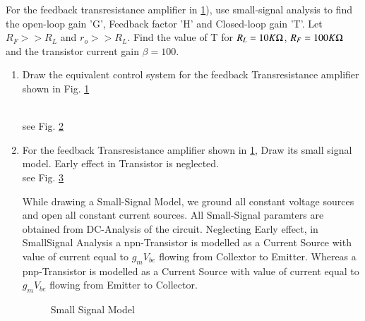 For the feedback transresistance amplifier in \ref{fig:ee18btech11046_Question}), use small-signal analysis to find the open-loop gain 'G', Feedback factor 'H' and Closed-loop gain 'T'. Let $R_{F}>>R_{L}$ and $r_{o}>>R_{L}$. Find the value of T for $R_{L}=10K\ohm$, $R_{F}=100K\ohm$ and the transistor current gain $\beta = 100$.
\begin{enumerate}[label=\arabic*.,ref=\theenumi]
\item Draw the equivalent control system for the feedback Transresistance amplifier shown in Fig. \ref{fig:ee18btech11046_Question}
\renewcommand{\thefigure}{\theenumi.\arabic{figure}}
\begin{figure}[h!]
	\begin{center}
		\resizebox{\columnwidth/1}{!}{}
	\end{center}
	\caption{}
	\label{fig:ee18btech11046_Question}
\end{figure}
\\

%
\solution see Fig. \ref{fig:ee18btech11046_ControlSystem}
\begin{figure}[ht!]
	\begin{center}
		\resizebox{\columnwidth}{!}{}
	\end{center}
	\caption{}
	\label{fig:ee18btech11046_ControlSystem}
\end{figure}
\renewcommand{\thefigure}{\theenumi}

%

\item For the feedback Transresistance amplifier shown in \ref{fig:ee18btech11046_Question}, Draw its small signal model. Early effect in Transistor is neglected.
\\

%
\solution see Fig. \ref {fig:ee18btech11046_smallSig}

While drawing a Small-Signal Model, we
ground all constant voltage sources and open
all constant current sources. All Small-Signal
paramters are obtained from DC-Analysis of
the circuit. Neglecting Early effect, in SmallSignal Analysis a npn-Transistor is modelled as
a Current Source with value of current equal to
$g_{m}V_{be}$ flowing from Collextor to Emitter. Whereas
a pnp-Transistor is modelled as a Current Source
with value of current equal to $g_{m}V_{be}$ flowing
from Emitter to Collector.

\begin{figure}[ht!]
	\begin{center}
		\resizebox{\columnwidth}{!}{}
	\end{center}
	\caption{Small Signal Model}
	\label{fig:ee18btech11046_smallSig}
\end{figure}
\renewcommand{\thefigure}{\theenumi}


\end{enumerate}
